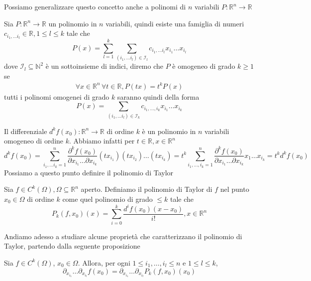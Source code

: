 \documentclass[openany, italian]{book}
\begin{document}
Possiamo generalizzare questo concetto anche a polinomi di $n$ variabili $P: \mathbb{R}^n \to \mathbb{R}$
\begin{definition}
Sia $P:\mathbb{R}^n \to \mathbb{R}$ un polinomio in $n$ variabili, quindi esiste una famiglia di numeri $c_{i_1, \ldots i_l} \in \mathbb{R}, 1 \leq l \leq k$ tale che
$$
P(x) = \sum_{l=1}^k \sum_{(i_1, \ldots i_l) \in \mathcal{I}_l} c_{i_1, \ldots i_l} x_{i_1} \ldots x_{i_l}
$$
dove $\mathcal{I}_l \subseteq \mathbb{N}^2$ è un sottoinsieme di indici, diremo che $P$ è omogeneo di grado $k \geq 1$ se
\begin{align*}
\forall x \in \mathbb{R}^n \, \forall t \in \mathbb{R}, P(tx) = t^k P(x)
\end{align*}
tutti i polinomi omogenei di grado $k$ saranno quindi della forma
$$
P(x) = \sum_{(i_1, \ldots i_l) \in \mathcal{I}_k} c_{i_1, \ldots, i_k} x_{i_1} \ldots x_{i_k}
$$
\end{definition}
Il differenziale $d^k f(x_0): \mathbb{R}^n \to \mathbb{R}$ di ordine $k$ è un polinomio in $n$ variabili omogeneo di ordine $k$. Abbiamo infatti per $t \in \mathbb{R}, x \in \mathbb{R}^n$
$$
d^k f(x_0) = \sum_{i_1, \ldots i_k = 1}^n \frac{\partial^k f(x_0)}{\partial x_{i_1} \ldots \partial x_{i_k}}(tx_{i_1})(tx_{i_2}) \ldots (tx_{i_k}) = t^k \sum_{i_1, \ldots, i_k = 1}^n \frac{\partial^k f(x_0)}{\partial x_{i_1} \ldots \partial x_{i_k}} x_1 \ldots x_{i_k} = t^k d^k f(x_0)
$$
Possiamo a questo punto definire il polinomio di Taylor
\begin{definition}
Sia $f \in C^{k}(\Omega), \Omega \subseteq \mathbb{R}^n$ aperto. Definiamo il polinomio di Taylor di $f$ nel punto $x_0 \in \Omega$ di ordine $k$ come quel polinomio di grado $\leq k$ tale che
$$
P_k(f, x_0)(x) = \sum_{i=0}^k \frac{d^i f(x_0)(x-x_0)}{i!}, x \in \mathbb{R}^n
$$
\end{definition}
Andiamo adesso a studiare alcune proprietà che caratterizzano il polinomio di Taylor, partendo dalla seguente proposizione
\begin{prop}
Sia $f \in C^k(\Omega)$, $x_0 \in \Omega$. Allora, per ogni $1 \leq i_1, \ldots, i_l \leq n$ e $1 \leq l \leq k$,
$$
\partial_{x_{i_1}} \ldots \partial_{x_{i_l}} f(x_0) = \partial_{x_{i_1}} \ldots \partial_{x_{i_l}} P_k(f, x_0)(x_0)
$$

\end{prop}
\end{document}
